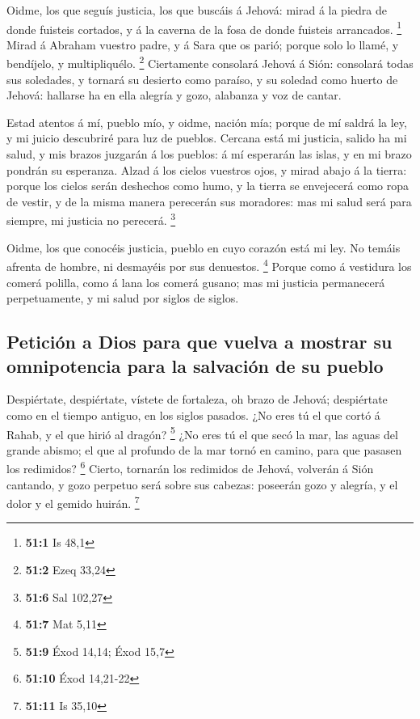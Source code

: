  Oidme, los que seguís justicia, los que buscáis á Jehová:
mirad á la piedra de donde fuisteis cortados, y á la caverna de la fosa
de donde fuisteis arrancados. \footnote{\textbf{51:1} Is 48,1}
 Mirad á Abraham vuestro padre, y á Sara que os parió;
porque solo lo llamé, y bendíjelo, y multipliquélo. \footnote{\textbf{51:2}
  Ezeq 33,24}  Ciertamente consolará Jehová á Sión:
consolará todas sus soledades, y tornará su desierto como paraíso, y su
soledad como huerto de Jehová: hallarse ha en ella alegría y gozo,
alabanza y voz de cantar.

 Estad atentos á mí, pueblo mío, y oidme, nación mía;
porque de mí saldrá la ley, y mi juicio descubriré para luz de pueblos.
 Cercana está mi justicia, salido ha mi salud, y mis
brazos juzgarán á los pueblos: á mí esperarán las islas, y en mi brazo
pondrán su esperanza.  Alzad á los cielos vuestros ojos, y
mirad abajo á la tierra: porque los cielos serán deshechos como humo, y
la tierra se envejecerá como ropa de vestir, y de la misma manera
perecerán sus moradores: mas mi salud será para siempre, mi justicia no
perecerá. \footnote{\textbf{51:6} Sal 102,27}

 Oidme, los que conocéis justicia, pueblo en cuyo corazón
está mi ley. No temáis afrenta de hombre, ni desmayéis por sus
denuestos. \footnote{\textbf{51:7} Mat 5,11}  Porque como
á vestidura los comerá polilla, como á lana los comerá gusano; mas mi
justicia permanecerá perpetuamente, y mi salud por siglos de siglos.

\hypertarget{peticiuxf3n-a-dios-para-que-vuelva-a-mostrar-su-omnipotencia-para-la-salvaciuxf3n-de-su-pueblo}{%
\subsection{Petición a Dios para que vuelva a mostrar su omnipotencia
para la salvación de su
pueblo}\label{peticiuxf3n-a-dios-para-que-vuelva-a-mostrar-su-omnipotencia-para-la-salvaciuxf3n-de-su-pueblo}}

 Despiértate, despiértate, vístete de fortaleza, oh brazo
de Jehová; despiértate como en el tiempo antiguo, en los siglos pasados.
¿No eres tú el que cortó á Rahab, y el que hirió al dragón? \footnote{\textbf{51:9}
  Éxod 14,14; Éxod 15,7}  ¿No eres tú el que secó la mar,
las aguas del grande abismo; el que al profundo de la mar tornó en
camino, para que pasasen los redimidos? \footnote{\textbf{51:10} Éxod
  14,21-22}  Cierto, tornarán los redimidos de Jehová,
volverán á Sión cantando, y gozo perpetuo será sobre sus cabezas:
poseerán gozo y alegría, y el dolor y el gemido huirán. \footnote{\textbf{51:11}
  Is 35,10}

